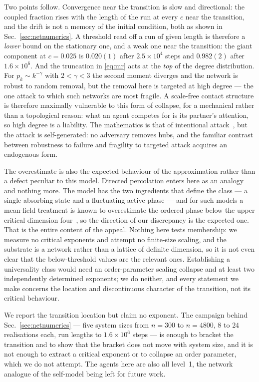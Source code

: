 \documentclass[aps,pre,twocolumn,superscriptaddress,floatfix,longbibliography]{revtex4-2}
\begin{document}
Two points follow. Convergence near the transition is slow and directional:
the coupled fraction rises with the length of the run at every $c$ near the
transition, and the drift is not a memory of the initial condition, both as
shown in Sec.~\ref{sec:netnumerics}. A threshold read off a run of given length
is therefore a \emph{lower} bound on the stationary one, and a weak one near the
transition: the giant component at $c=0.025$ is $0.020(1)$ after
$2.5\times10^{4}$ steps and $0.982(2)$ after $1.6\times10^{6}$. And the truncation in \eqref{eq:mr} acts at the \emph{top}
of the degree distribution. For $p_k\sim k^{-\gamma}$ with
$2<\gamma<3$ the second moment diverges and the network is robust to random
removal, but the removal here is targeted at high degree --- the one attack to
which such networks are most fragile. A scale-free contact structure is
therefore maximally vulnerable to this form of collapse, for a mechanical rather
than a topological reason: what an agent competes for is its partner's
attention, so high degree is a liability. The mathematics is that of intentional
attack~\cite{cohen2001}, but the attack is self-generated: no adversary removes
hubs, and the familiar contrast between robustness to failure and fragility to
targeted attack acquires an endogenous form.

The overestimate is also the expected behaviour of the approximation rather than
a defect peculiar to this model. Directed percolation enters here as an
analogy and nothing more. The model has the two ingredients that define the class
--- a single absorbing state and a fluctuating active phase --- and for such
models a mean-field treatment is known to overestimate the ordered phase below
the upper critical dimension four~\cite{hinrichsen2000}, so the direction of our
discrepancy is the expected one. That is the entire content of the appeal.
Nothing here tests membership: we measure no critical exponents and attempt no
finite-size scaling, and the substrate is a network rather than a lattice of
definite dimension, so it is not even clear that the below-threshold values are
the relevant ones. Establishing a universality class would need an
order-parameter scaling collapse and at least two independently determined
exponents; we do neither, and every statement we make concerns the location and
discontinuous character of the transition, not its critical behaviour.

We report the transition location but claim no exponent. The campaign
behind Sec.~\ref{sec:netnumerics} --- five system sizes from $n=300$ to
$n=4800$, $8$ to $24$ realisations each, run lengths to $1.6\times10^{6}$ steps
--- is enough to bracket the transition and to show that the bracket does not
move with system size, and it is not enough to extract a critical exponent or to
collapse an order parameter, which we do not attempt. The agents here are also
all level~1, the network analogue of the self-model being left for future
work.
\end{document}
